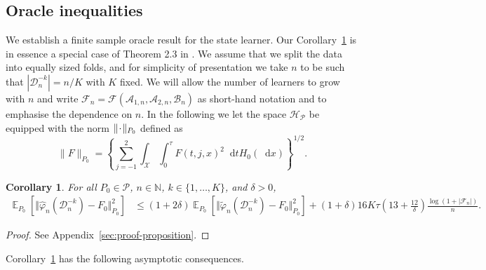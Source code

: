 \documentclass[numsec,webpdf,contemporary,medium,namedate]{oup-authoring-template}%
\theoremstyle{thmstyleone}%
\newtheorem{corollary}{Corollary}
\theoremstyle{thmstyletwo}%
\theoremstyle{thmstylethree}%
\DeclareMathOperator{\E}{\mathbb{E}} %
\newcommand{\N}{\mathbb{N}}
\newcommand{\blank}{\makebox[1ex]{\textbf{$\cdot$}}}
\renewcommand{\phi}{\varphi}
\newcommand*\diff{\mathop{}\!\mathrm{d}}
\newcommand{\1}{\mathds{1}}
\newcommand{\data}{\ensuremath{\mathcal{D}}}
\begin{document}
\subsection{Oracle inequalities}
\label{sec:finite-sample-oracle}

We establish a finite sample oracle result for the state learner. Our
Corollary~\ref{cor:oracle-prop} is in essence a special case of
Theorem 2.3 in \citep{vaart2006oracle}.  We assume that we split the
data into equally sized folds, and for simplicity of presentation we
take \( n \) to be such that \( |\data_n^{-k}| = n/K \) with \( K \)
fixed. We will allow the number of learners to grow with \( n \) and
write
\( \mathcal{F}_n=\mathcal{F}(\mathcal{A}_{1,n}, \mathcal{A}_{2,n},
\mathcal{B}_n)\) as short-hand notation and to emphasise the
dependence on \( n \).
In the following we let the space \( \mathcal{H}_{\mathcal{P}} \) be equipped with the norm
\( \| \blank \|_{P_0} \) defined as
\begin{equation}
  \label{eq:norm}
  \| F \|_{P_0} = 
  \left\{
    \sum_{j=-1}^{2}\int_{\mathcal{X}} \int_0^{\tau} F(t, j, x)^2 \diff t H_0( \diff x)
  \right\}^{1/2}.
\end{equation}

\begin{corollary}
  \label{cor:oracle-prop}
  For all \(P_0\in\mathcal{P}\), \( n \in \N \), \( k \in \{1, \dots, K\} \),
  and $\delta>0$,
  \begin{align*}
    \E_{P_0}{\left[ \Vert \hat{\phi}_n(\data_n^{-k}) - F_0 \Vert_{P_0}^2 \right]}
    & \leq (1 + 2\delta)
      \E_{P_0}{\left[ \Vert \tilde{\phi}_n(\data_n^{-k}) - F_0 \Vert_{P_0}^2 \right]}
      + (1+ \delta) 16   K \tau
      \left(
      13 + \frac{12}{\delta}
      \right)
      \frac{\log(1 + |\mathcal{F}_n|)}{n}.
  \end{align*}
\end{corollary}
\begin{proof}
  See Appendix~\ref{sec:proof-proposition}.
\end{proof}

Corollary~\ref{cor:oracle-prop} has the following asymptotic consequences.
\end{document}
